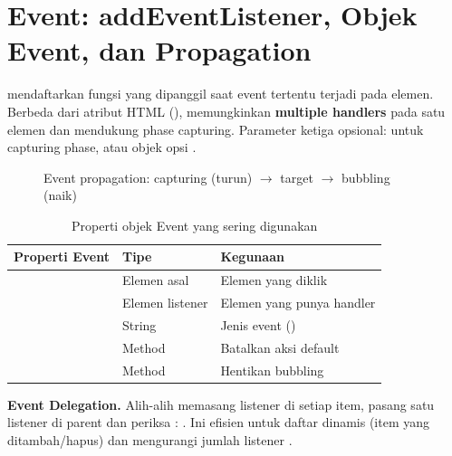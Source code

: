 \section{Event: addEventListener, Objek Event, dan Propagation}

 mendaftarkan fungsi yang dipanggil saat event tertentu terjadi pada elemen. Berbeda dari atribut HTML (),  memungkinkan \textbf{multiple handlers} pada satu elemen dan mendukung phase capturing. Parameter ketiga opsional:  untuk capturing phase, atau objek opsi  \cite{jsInfo}.

\begin{figure}[htbp]
\centering
{}
\caption{Event propagation: capturing (turun) $\rightarrow$ target $\rightarrow$ bubbling (naik)}
\end{figure}

\begin{table}[htbp]
\centering
\scriptsize
\begin{tabular}{|P{3.5cm}|P{2.4cm}|P{2.6cm}|}
\hline
\textbf{Properti Event} & \textbf{Tipe} & \textbf{Kegunaan} \\
\hline
{} & Elemen asal & Elemen yang diklik \\
\hline
{} & Elemen listener & Elemen yang punya handler \\
\hline
{} & String & Jenis event () \\
\hline
{}\linebreak[0] & Method & Batalkan aksi default \\
\hline
{}\linebreak[0] & Method & Hentikan bubbling \\
\hline
\end{tabular}
\caption{Properti objek Event yang sering digunakan}
\end{table}

\begin{konsep}
\textbf{Event Delegation.} Alih-alih memasang listener di setiap item, pasang satu listener di parent dan periksa : . Ini efisien untuk daftar dinamis (item yang ditambah/hapus) dan mengurangi jumlah listener \cite{mdnJsGuide}.
\end{konsep}

